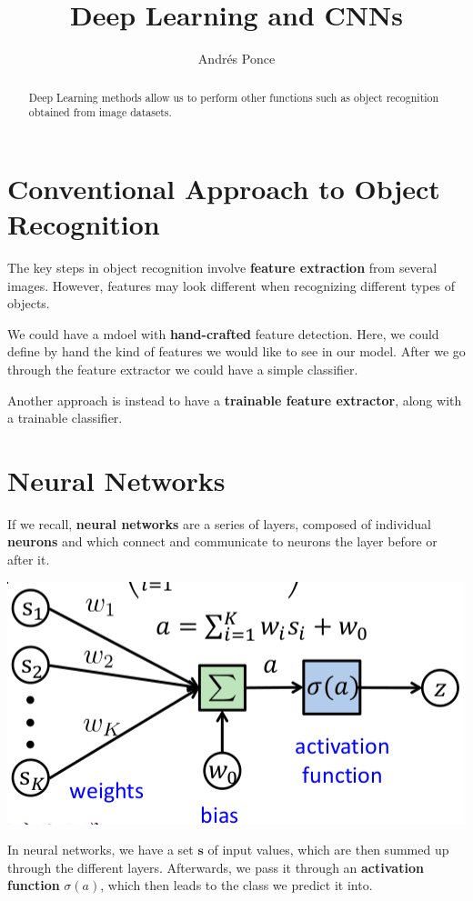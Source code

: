 \documentclass{tufte-handout}
\title{Deep Learning and CNNs}
\author{Andr\'es Ponce}
\begin{document}
\maketitle

\begin{abstract}
Deep Learning methods allow us to perform other functions such as 
object recognition obtained from image datasets.
\end{abstract}

\section{Conventional Approach to Object Recognition}
The key steps in object recognition involve \textbf{feature extraction}
from several images. However, features may look different when recognizing 
different types of objects.

We could have a mdoel with \textbf{hand-crafted} feature detection. Here, we could
define by hand the kind of features we would like to see in our model. After we go through
the feature extractor we could have a simple classifier. 

Another approach is instead to have a \textbf{trainable feature extractor}, 
along with a trainable classifier.

\section{Neural Networks}
If we recall, \textbf{neural networks} are a series of layers, composed of individual 
\textbf{neurons} and which connect and communicate to neurons the layer before or after it.

\begin{marginfigure}
	\includegraphics[scale=0.3]{NNs}
	\caption{In neural networks, we have a set $\mathbf{s}$ of input values, which are then 
		summed up through the different layers. Afterwards, we pass it through an 
	\textbf{activation function} $\sigma(a)$, which then leads to the class we predict it into.
	}
\end{marginfigure}
\end{document}
